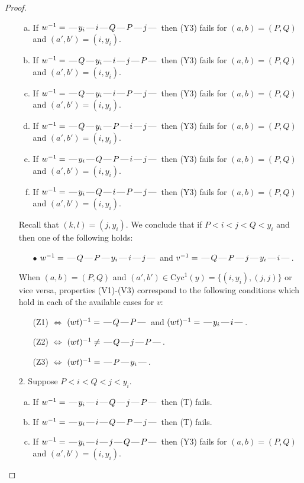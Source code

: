 \documentclass[10pt]{article}
\theoremstyle{definition}
\theoremstyle{definition}
\def\dash{\text{\hspace{0.5mm}---\hspace{0.5mm}}}
\def\Cyc{\mathrm{Cyc}}
\begin{document}
\begin{proof}
\begin{enumerate}
\begin{enumerate}[(a)]
\item If $w^{-1} = \dash y_i\dash i\dash Q\dash P\dash j\dash $ then (Y3) fails for $(a,b)=(P,Q)$ and $(a',b')=(i,y_i)$.
\item If $w^{-1} = \dash Q\dash y_i\dash i\dash j\dash P\dash $ then (Y3) fails for $(a,b)=(P,Q)$ and $(a',b')=(i,y_i)$.
\item If $w^{-1} = \dash Q\dash y_i\dash i\dash P\dash j\dash $ then (Y3) fails for $(a,b)=(P,Q)$ and $(a',b')=(i,y_i)$.
\item If $w^{-1} = \dash Q\dash y_i\dash P\dash i\dash j\dash $ then (Y3) fails for $(a,b)=(P,Q)$ and $(a',b')=(i,y_i)$.
\item If $w^{-1} = \dash y_i\dash Q\dash P\dash i\dash j\dash $ then (Y3) fails for $(a,b)=(P,Q)$ and $(a',b')=(i,y_i)$.
\item If $w^{-1} = \dash y_i\dash Q\dash i\dash P\dash j\dash $ then (Y3) fails for $(a,b)=(P,Q)$ and $(a',b')=(i,y_i)$.
\end{enumerate}
Recall that $(k,l) = (j,y_i)$.
We conclude that if $P < i < j < Q < y_i$ and then one of the following holds:
\begin{enumerate}
\item[$\bullet$] $w^{-1} = \dash Q\dash P\dash y_i\dash i\dash j\dash $ and $v^{-1} = \dash Q\dash P\dash j\dash y_i\dash i\dash $.
\end{enumerate}
When $(a,b)= (P,Q)$ and $(a',b')\in \Cyc^1(y)=\{(i,y_i),(j,j)\}$ or vice versa,
properties (V1)-(V3) correspond to the following conditions which hold in
each of the available cases for $v$:
\begin{enumerate}
\item[](Z1) $\Leftrightarrow$ $(wt)^{-1} = \dash Q \dash P \dash$  and $(wt)^{-1} = \dash y_i \dash i \dash$.
\item[](Z2) $\Leftrightarrow$ $(wt)^{-1} \neq \dash Q \dash j \dash P \dash$.
\item[](Z3) $\Leftrightarrow$ $(wt)^{-1} = \dash P \dash y_i \dash$.
\end{enumerate}
\item[$2$.] Suppose $P < i < Q < j < y_i$.
\begin{enumerate}[(a)]
\item If $w^{-1} = \dash y_i\dash i\dash Q\dash j\dash P\dash $ then (T) fails.
\item If $w^{-1} = \dash y_i\dash i\dash Q\dash P\dash j\dash $ then (T) fails.
\item If $w^{-1} = \dash y_i\dash i\dash j\dash Q\dash P\dash $ then (Y3) fails for $(a,b)=(P,Q)$ and $(a',b')=(i,y_i)$.

\end{enumerate}
\end{enumerate}
\end{proof}
\end{document}
